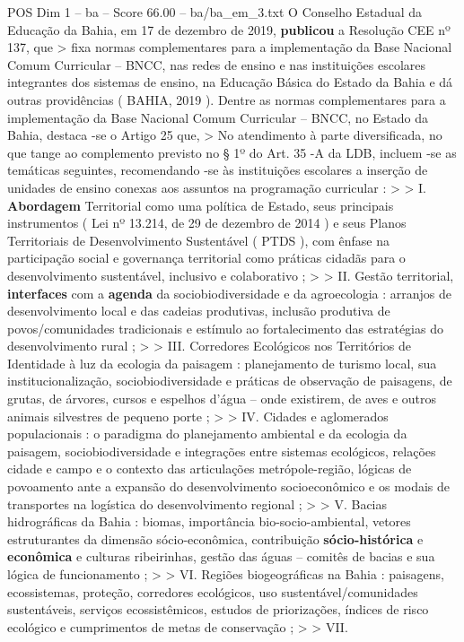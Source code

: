\begin{textsample}{POS Dim 1 – ba – Score 66.00 – ba/ba\_em\_3.txt}
O Conselho Estadual da Educação da Bahia, em 17 de dezembro de 2019, \textbf{publicou} a Resolução CEE nº 137, que > fixa normas complementares para a implementação da Base Nacional Comum Curricular – BNCC, nas redes de ensino e nas instituições escolares integrantes dos sistemas de ensino, na Educação Básica do Estado da Bahia e dá outras providências ( BAHIA, 2019 ).
Dentre as normas complementares para a implementação da Base Nacional Comum Curricular – BNCC, no Estado da Bahia, destaca -se o Artigo 25 que, > No atendimento à parte diversificada, no que tange ao complemento previsto no § 1º do Art. 35 -A da LDB, incluem -se as temáticas seguintes, recomendando -se às instituições escolares a inserção de unidades de ensino conexas aos assuntos na programação curricular : > > I. \textbf{Abordagem} Territorial como uma política de Estado, seus principais instrumentos ( Lei nº 13.214, de 29 de dezembro de 2014 ) e seus Planos Territoriais de Desenvolvimento Sustentável ( PTDS ), com ênfase na participação social e governança territorial como práticas cidadãs para o desenvolvimento sustentável, inclusivo e colaborativo ; > > II.
Gestão territorial, \textbf{interfaces} com a \textbf{agenda} da sociobiodiversidade e da agroecologia : arranjos de desenvolvimento local e das cadeias produtivas, inclusão produtiva de povos/comunidades tradicionais e estímulo ao fortalecimento das estratégias do desenvolvimento rural ; > > III.
Corredores Ecológicos nos Territórios de Identidade à luz da ecologia da paisagem : planejamento de turismo local, sua institucionalização, sociobiodiversidade e práticas de observação de paisagens, de grutas, de árvores, cursos e espelhos d’água – onde existirem, de aves e outros animais silvestres de pequeno porte ; > > IV.
Cidades e aglomerados populacionais : o paradigma do planejamento ambiental e da ecologia da paisagem, sociobiodiversidade e integrações entre sistemas ecológicos, relações cidade e campo e o contexto das articulações metrópole-região, lógicas de povoamento ante a expansão do desenvolvimento socioeconômico e os modais de transportes na logística do desenvolvimento regional ; > > V.
Bacias hidrográficas da Bahia : biomas, importância bio-socio-ambiental, vetores estruturantes da dimensão sócio-econômica, contribuição \textbf{sócio-histórica} e \textbf{econômica} e culturas ribeirinhas, gestão das águas – comitês de bacias e sua lógica de funcionamento ; > > VI.
Regiões biogeográficas na Bahia : paisagens, ecossistemas, proteção, corredores ecológicos, uso sustentável/comunidades sustentáveis, serviços ecossistêmicos, estudos de priorizações, índices de risco ecológico e cumprimentos de metas de conservação ; > > VII.

\end{textsample}
